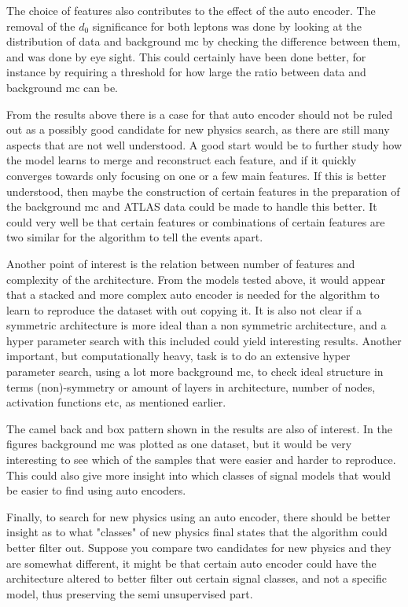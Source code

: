 \documentclass[ reprint, amsmath,amssymb, aps, nofootinbib]{revtex4-2}
\begin{document}
The choice of features also contributes to the effect of the auto encoder. The removal of the $d_0$ significance for both leptons was done by looking at the distribution of data and background mc by checking the difference between them, and was done by eye sight. This could certainly have been done better, for instance by requiring a threshold for how large the ratio between data and background mc can be. \par \par



From the results above there is a case for that auto encoder should not be ruled out as a possibly good candidate for new physics search, as there are still many aspects that are not well understood. A good start would be to further study how the model learns to merge and reconstruct each feature, and if it quickly converges towards only focusing on one or a few main features. If this is better understood, then maybe the construction of certain features in the preparation of the background mc and ATLAS data could be made to handle this better. It could very well be that certain features or combinations of certain features are two similar for the algorithm to tell the events apart. \par 
Another point of interest is the relation between number of features and complexity of the architecture. From the models tested above, it would appear that a stacked and more complex auto encoder is needed for the algorithm to learn to reproduce the dataset with out copying it. It is also not clear if a symmetric architecture is more ideal than a non symmetric architecture, and a hyper parameter search with this included could yield interesting results. Another important, but computationally heavy, task is to do an extensive hyper parameter search, using a lot more background mc, to check ideal structure in terms (non)-symmetry or amount of layers in architecture, number of nodes, activation functions etc, as mentioned earlier. \par 
The camel back and box pattern shown in the results are also of interest. In the figures background mc was plotted as one dataset, but it would be very interesting to see which of the samples that were easier and harder to reproduce. This could also give more insight into which classes of signal models that would be easier to find using auto encoders. \par Finally, to search for new physics using an auto encoder, there should be better insight as to what "classes" of new physics final states that the algorithm could better filter out. Suppose you compare two candidates for new physics and they are somewhat different, it might be that certain auto encoder could have the architecture altered to better filter out certain signal classes, and not a specific model, thus preserving the semi unsupervised part.   \par \par
\end{document}
